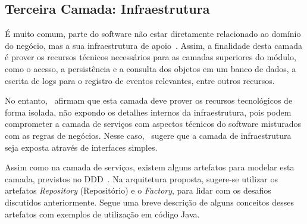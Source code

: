 \subsection{Terceira Camada: Infraestrutura}	


		É muito comum, parte do software 
		não estar diretamente relacionado 
		ao domínio do negócio, 
		mas a sua infraestrutura de apoio~\cite{avram2007domain}.
		Assim, a finalidade desta camada
		é prover os recursos técnicos
		necessários para as
		camadas superiores do módulo, 
		como o acesso, a persistência
		e a consulta dos objetos em um banco de dados, 
		a escrita de logs para o registro de eventos relevantes,	
		entre outros recursos.

		No entanto,~\cite{evans2004domain, fowler2002patterns} 
		afirmam que esta camada 
		deve prover os recursos 
		tecnológicos de forma isolada,
		não expondo
		os detalhes internos da 
		infraestrutura,
		pois podem comprometer a 
		camada de serviços
		com aspectos
		técnicos do software misturados com
		as regras de negócios. 
		Nesse caso,~\cite{avram2007domain} 
		sugere que a camada de infraestrutura
		seja exposta através de interfaces simples.
	

		Assim como na camada de serviços,
		existem alguns artefatos
		para modelar esta camada, 
		previstos no \acrshort{DDD}~\cite{evans2004domain}.
		Na arquitetura proposta, 
		sugere-se utilizar
		os artefatos \textit{Repository} (Repositório)
	 	e o \textit{Factory}, para lidar
	 	com os desafios discutidos anteriormente.
		Segue uma breve descrição
		de alguns conceitos desses artefatos 
		com exemplos de utilização em código Java.
			
